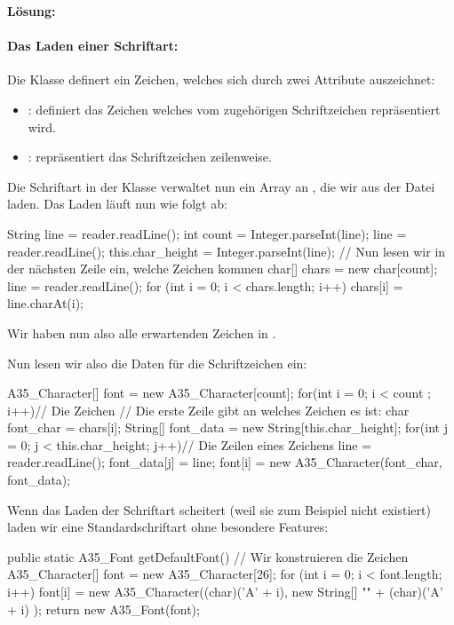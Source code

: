 \documentclass[table]{sopra-base}
\makeatletter
\newenvironment{solution}{\null\par\noindent\textbf{\textcolor{sob@col@uulm@cs}{Lösung:}}\newline\bgroup\color{black}\slshape\ignorespaces}{\egroup}
\makeatother
\begin{document}
\begin{solution}
    \paragraph{Das Laden einer Schriftart:}
    \bgroup
        Die Klasse  definert ein Zeichen, welches sich durch zwei
        Attribute auszeichnet:
        \begin{itemize}[nolistsep]
            \item {}: definiert das Zeichen welches vom zugehörigen Schriftzeichen repräsentiert wird.
            \item {}: repräsentiert das Schriftzeichen zeilenweise.
        \end{itemize}
        Die Schriftart in der Klasse  verwaltet nun ein Array an , die wir aus der Datei laden. Das Laden läuft nun wie folgt ab:
\begin{java}[firstnumber=66]
String line = reader.readLine();
int count = Integer.parseInt(line);
line = reader.readLine();
this.char_height = Integer.parseInt(line);
// Nun lesen wir in der nächsten Zeile ein, welche Zeichen kommen
char[] chars = new char[count];
line = reader.readLine();
for (int i = 0; i < chars.length; i++)
    chars[i] = line.charAt(i);
\end{java}
Wir haben nun also alle erwartenden Zeichen in . \par{}
Nun lesen wir also die Daten für die Schriftzeichen ein:
\begin{java}[firstnumber=75]
A35_Character[] font = new A35_Character[count];
for(int i = 0; i < count ; i++){// Die Zeichen
    // Die erste Zeile gibt an welches Zeichen es ist:
    char font_char = chars[i];
    String[] font_data = new String[this.char_height];
    for(int j = 0; j < this.char_height; j++){// Die Zeilen eines Zeichens
        line = reader.readLine();
        font_data[j] = line;
    }
    font[i] = new A35_Character(font_char, font_data);
}
\end{java}
    Wenn das Laden der Schriftart scheitert (weil sie zum Beispiel nicht existiert) laden wir eine Standardschriftart ohne besondere Features:
\begin{java}[firstnumber=102]
public static A35_Font getDefaultFont(){
    // Wir konstruieren die Zeichen
    A35_Character[] font = new A35_Character[26];
    for (int i = 0; i < font.length; i++) {
        font[i] = new A35_Character((char)('A' + i),
                        new String[] {"" + (char)('A' + i)}
                  );
    }
    return new A35_Font(font);
}
\end{java}

\end{solution}
\end{document}
